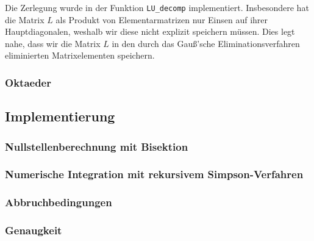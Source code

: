 \documentclass[10pt,a4paper]{article}
\begin{document}
Die Zerlegung wurde in der Funktion \texttt{LU\_decomp} implementiert. Insbesondere hat die Matrix $L$ als Produkt von Elementarmatrizen nur Einsen auf ihrer Hauptdiagonalen, weshalb wir diese nicht explizit speichern müssen. Dies legt nahe, dass wir die Matrix $L$ in den durch das Gauß'sche Eliminationsverfahren eliminierten Matrixelementen speichern.


\subsubsection{Oktaeder}

\subsection{Implementierung}

\subsubsection{Nullstellenberechnung mit Bisektion}

\subsubsection{Numerische Integration mit rekursivem Simpson-Verfahren}


\subsubsection{Abbruchbedingungen}

\subsubsection{Genaugkeit}
\end{document}
